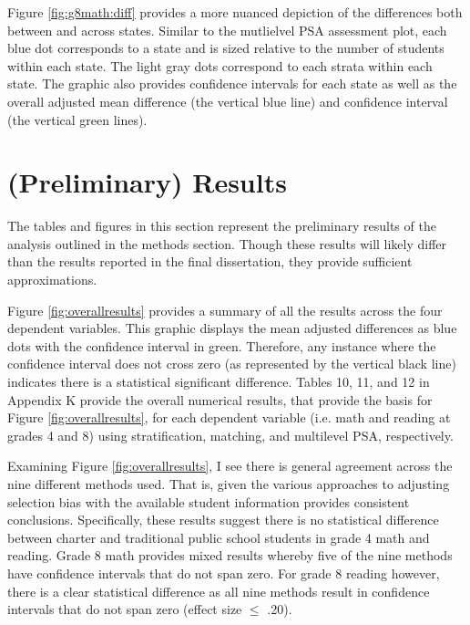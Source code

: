 \documentclass[letterpaper,12pt]{article}
\begin{document}
Figure \ref{fig:g8math:diff} provides a more nuanced depiction of the differences both between and across states. Similar to the mutlielvel PSA assessment plot, each blue dot corresponds to a state and is sized relative to the number of students within each state. The light gray dots correspond to each strata within each state. The graphic also provides confidence intervals for each state as well as the overall adjusted mean difference (the vertical blue line) and confidence interval (the vertical green lines).


\section{(Preliminary) Results}

The tables and figures in this section represent the preliminary results of the analysis outlined in the methods section. Though these results will likely differ than the results reported in the final dissertation, they provide sufficient approximations. 

Figure \ref{fig:overallresults} provides a summary of all the results across the four dependent variables. This graphic displays the mean adjusted differences as blue dots with the confidence interval in green. Therefore, any instance where the confidence interval does not cross zero (as represented by the vertical black line) indicates there is a statistical significant difference. Tables 10, 11, and 12 in Appendix K provide the  overall numerical results, that provide the basis for Figure \ref{fig:overallresults}, for each dependent variable (i.e. math and reading at grades 4 and 8) using stratification, matching, and multilevel PSA, respectively. 

Examining Figure \ref{fig:overallresults}, I see there is general agreement across the nine different methods used. That is, given the various approaches to adjusting selection bias with the available student information provides consistent conclusions. Specifically, these results suggest there is no statistical difference between charter and traditional public school students in grade 4 math and reading. Grade 8 math provides mixed results whereby five of the nine methods have confidence intervals that do not span zero. For grade 8 reading however, there is a clear statistical difference as all nine methods result in confidence intervals that do not span zero (effect size $\le$ .20).
\end{document}
